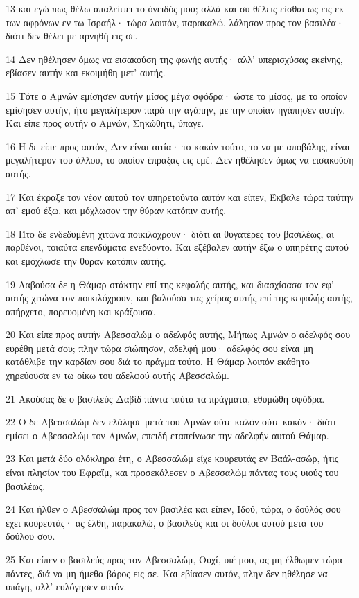 \par 13 και εγώ πως θέλω απαλείψει το όνειδός μου; αλλά και συ θέλεις είσθαι ως εις εκ των αφρόνων εν τω Ισραήλ· τώρα λοιπόν, παρακαλώ, λάλησον προς τον βασιλέα· διότι δεν θέλει με αρνηθή εις σε.
\par 14 Δεν ηθέλησεν όμως να εισακούση της φωνής αυτής· αλλ' υπερισχύσας εκείνης, εβίασεν αυτήν και εκοιμήθη μετ' αυτής.
\par 15 Τότε ο Αμνών εμίσησεν αυτήν μίσος μέγα σφόδρα· ώστε το μίσος, με το οποίον εμίσησεν αυτήν, ήτο μεγαλήτερον παρά την αγάπην, με την οποίαν ηγάπησεν αυτήν. Και είπε προς αυτήν ο Αμνών, Σηκώθητι, ύπαγε.
\par 16 Η δε είπε προς αυτόν, Δεν είναι αιτία· το κακόν τούτο, το να με αποβάλης, είναι μεγαλήτερον του άλλου, το οποίον έπραξας εις εμέ. Δεν ηθέλησεν όμως να εισακούση αυτής.
\par 17 Και έκραξε τον νέον αυτού τον υπηρετούντα αυτόν και είπεν, Έκβαλε τώρα ταύτην απ' εμού έξω, και μόχλωσον την θύραν κατόπιν αυτής.
\par 18 Ήτο δε ενδεδυμένη χιτώνα ποικιλόχρουν· διότι αι θυγατέρες του βασιλέως, αι παρθένοι, τοιαύτα επενδύματα ενεδύοντο. Και εξέβαλεν αυτήν έξω ο υπηρέτης αυτού και εμόχλωσε την θύραν κατόπιν αυτής.
\par 19 Λαβούσα δε η Θάμαρ στάκτην επί της κεφαλής αυτής, και διασχίσασα τον εφ' αυτής χιτώνα τον ποικιλόχρουν, και βαλούσα τας χείρας αυτής επί της κεφαλής αυτής, απήρχετο, πορευομένη και κράζουσα.
\par 20 Και είπε προς αυτήν Αβεσσαλώμ ο αδελφός αυτής, Μήπως Αμνών ο αδελφός σου ευρέθη μετά σου; πλην τώρα σιώπησον, αδελφή μου· αδελφός σου είναι μη κατάθλιβε την καρδίαν σου διά το πράγμα τούτο. Η Θάμαρ λοιπόν εκάθητο χηρεύουσα εν τω οίκω του αδελφού αυτής Αβεσσαλώμ.
\par 21 Ακούσας δε ο βασιλεύς Δαβίδ πάντα ταύτα τα πράγματα, εθυμώθη σφόδρα.
\par 22 Ο δε Αβεσσαλώμ δεν ελάλησε μετά του Αμνών ούτε καλόν ούτε κακόν· διότι εμίσει ο Αβεσσαλώμ τον Αμνών, επειδή εταπείνωσε την αδελφήν αυτού Θάμαρ.
\par 23 Και μετά δύο ολόκληρα έτη, ο Αβεσσαλώμ είχε κουρευτάς εν Βαάλ-ασώρ, ήτις είναι πλησίον του Εφραΐμ, και προσεκάλεσεν ο Αβεσσαλώμ πάντας τους υιούς του βασιλέως.
\par 24 Και ήλθεν ο Αβεσσαλώμ προς τον βασιλέα και είπεν, Ιδού, τώρα, ο δούλός σου έχει κουρευτάς· ας έλθη, παρακαλώ, ο βασιλεύς και οι δούλοι αυτού μετά του δούλου σου.
\par 25 Και είπεν ο βασιλεύς προς τον Αβεσσαλώμ, Ουχί, υιέ μου, ας μη έλθωμεν τώρα πάντες, διά να μη ήμεθα βάρος εις σε. Και εβίασεν αυτόν, πλην δεν ηθέλησε να υπάγη, αλλ' ευλόγησεν αυτόν.
